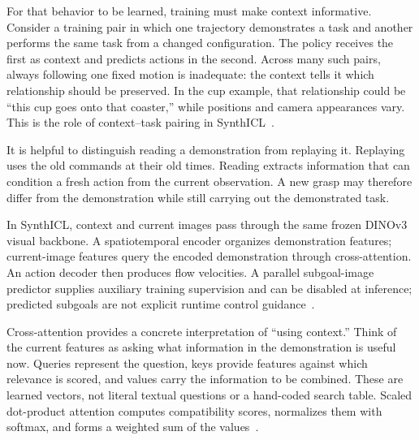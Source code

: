 For that behavior to be learned, training must make context informative. Consider a training pair in which one trajectory demonstrates a task and another performs the same task from a changed configuration. The policy receives the first as context and predicts actions in the second. Across many such pairs, always following one fixed motion is inadequate: the context tells it which relationship should be preserved. In the cup example, that relationship could be ``this cup goes onto that coaster,'' while positions and camera appearances vary. This is the role of context--task pairing in SynthICL~\citep{synthicl}.

It is helpful to distinguish reading a demonstration from replaying it. Replaying uses the old commands at their old times. Reading extracts information that can condition a fresh action from the current observation. A new grasp may therefore differ from the demonstration while still carrying out the demonstrated task.

In SynthICL, context and current images pass through the same frozen DINOv3 visual backbone. A spatiotemporal encoder organizes demonstration features; current-image features query the encoded demonstration through cross-attention. An action decoder then produces flow velocities. A parallel subgoal-image predictor supplies auxiliary training supervision and can be disabled at inference; predicted subgoals are not explicit runtime control guidance~\citep{synthicl}.




Cross-attention provides a concrete interpretation of ``using context.'' Think of the current features as asking what information in the demonstration is useful now. Queries represent the question, keys provide features against which relevance is scored, and values carry the information to be combined. These are learned vectors, not literal textual questions or a hand-coded search table. Scaled dot-product attention computes compatibility scores, normalizes them with softmax, and forms a weighted sum of the values~\citep{attention}.

